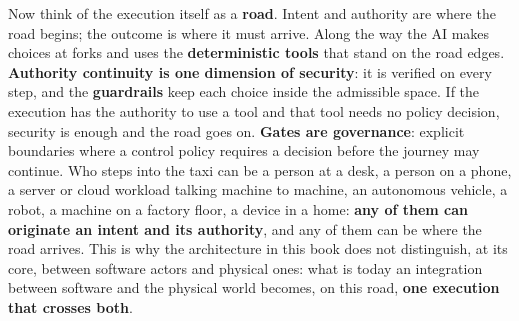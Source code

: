\documentclass[10pt,oneside,openany]{book}
\begin{document}
{\begin{center}
\end{center}

Now think of the execution itself as a \textbf{road}. Intent and authority are where the road begins; the outcome is where it must arrive. Along the way the AI makes choices at forks and uses the \textbf{deterministic tools} that stand on the road edges. \textbf{Authority continuity is one dimension of security}: it is verified on every step, and the \textbf{guardrails} keep each choice inside the admissible space. If the execution has the authority to use a tool and that tool needs no policy decision, security is enough and the road goes on. \textbf{Gates are governance}: explicit boundaries where a control policy requires a decision before the journey may continue. Who steps into the taxi can be a person at a desk, a person on a phone, a server or cloud workload talking machine to machine, an autonomous vehicle, a robot, a machine on a factory floor, a device in a home: \textbf{any of them can originate an intent and its authority}, and any of them can be where the road arrives. This is why the architecture in this book does not distinguish, at its core, between software actors and physical ones: what is today an integration between software and the physical world becomes, on this road, \textbf{one execution that crosses both}.

}
\end{document}
